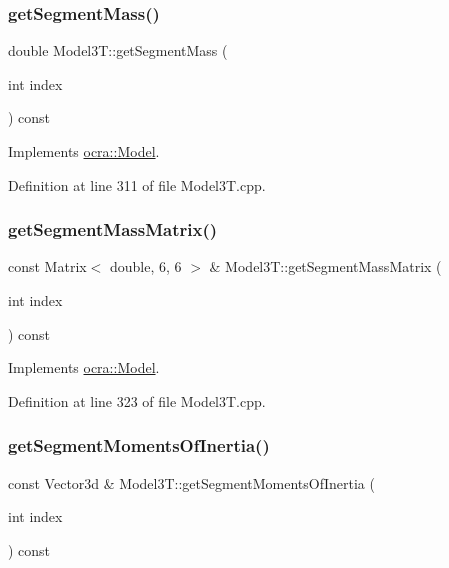 \subsubsection{\texorpdfstring{get\+Segment\+Mass()}{getSegmentMass()}}
{\footnotesize\ttfamily double Model3\+T\+::get\+Segment\+Mass (\begin{DoxyParamCaption}\item[{int}]{index }\end{DoxyParamCaption}) const\hspace{0.3cm}{\ttfamily [virtual]}}



Implements \hyperlink{classocra_1_1Model_a9840649a6137c8ec964914f91c83a1b9}{ocra\+::\+Model}.



Definition at line 311 of file Model3\+T.\+cpp.

\hypertarget{classModel3T_a5bd15fc87b6490e3828953073b52a836}{}\label{classModel3T_a5bd15fc87b6490e3828953073b52a836} 
\subsubsection{\texorpdfstring{get\+Segment\+Mass\+Matrix()}{getSegmentMassMatrix()}}
{\footnotesize\ttfamily const Matrix$<$ double, 6, 6 $>$ \& Model3\+T\+::get\+Segment\+Mass\+Matrix (\begin{DoxyParamCaption}\item[{int}]{index }\end{DoxyParamCaption}) const\hspace{0.3cm}{\ttfamily [virtual]}}



Implements \hyperlink{classocra_1_1Model_ae795ffdaa76419eb74acba87555b83bb}{ocra\+::\+Model}.



Definition at line 323 of file Model3\+T.\+cpp.

\hypertarget{classModel3T_abac667ae49c8690ddf20ca1ae0154459}{}\label{classModel3T_abac667ae49c8690ddf20ca1ae0154459} 
\subsubsection{\texorpdfstring{get\+Segment\+Moments\+Of\+Inertia()}{getSegmentMomentsOfInertia()}}
{\footnotesize\ttfamily const Vector3d \& Model3\+T\+::get\+Segment\+Moments\+Of\+Inertia (\begin{DoxyParamCaption}\item[{int}]{index }\end{DoxyParamCaption}) const\hspace{0.3cm}{\ttfamily [virtual]}}




